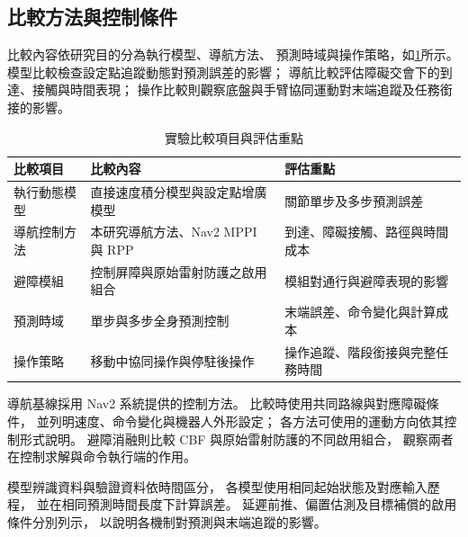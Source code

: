 \subsection{比較方法與控制條件}
\label{subsec:baseline_methods_control_conditions}

比較內容依研究目的分為執行模型、導航方法、
預測時域與操作策略，如\cref{tab:ch4_comparison_design}所示。
模型比較檢查設定點追蹤動態對預測誤差的影響；
導航比較評估障礙交會下的到達、接觸與時間表現；
操作比較則觀察底盤與手臂協同運動對末端追蹤及任務銜接的影響。

\begin{table}[htbp]
    \centering
    \caption{實驗比較項目與評估重點}
    \label{tab:ch4_comparison_design}
    \begingroup
    \small
    \renewcommand{\arraystretch}{1.25}
    \begin{tabular}{p{} p{} p{}}
        \hline
        比較項目 & 比較內容 & 評估重點 \\
        \hline
        執行動態模型
        & 直接速度積分模型與設定點增廣模型
        & 關節單步及多步預測誤差 \\

        導航控制方法
        & 本研究導航方法、Nav2 MPPI 與 RPP
        & 到達、障礙接觸、路徑與時間成本 \\

        避障模組
        & 控制屏障與原始雷射防護之啟用組合
        & 模組對通行與避障表現的影響 \\

        預測時域
        & 單步與多步全身預測控制
        & 末端誤差、命令變化與計算成本 \\

        操作策略
        & 移動中協同操作與停駐後操作
        & 操作追蹤、階段銜接與完整任務時間 \\
        \hline
    \end{tabular}
    \endgroup
\end{table}

導航基線採用 Nav2 系統提供的控制方法\cite{macenski2020nav2}。
比較時使用共同路線與對應障礙條件，
並列明速度、命令變化與機器人外形設定；
各方法可使用的運動方向依其控制形式說明。
避障消融則比較 CBF 與原始雷射防護的不同啟用組合，
觀察兩者在控制求解與命令執行端的作用。

模型辨識資料與驗證資料依時間區分，
各模型使用相同起始狀態及對應輸入歷程，
並在相同預測時間長度下計算誤差。
延遲前推、偏置估測及目標補償的啟用條件分別列示，
以說明各機制對預測與末端追蹤的影響。

